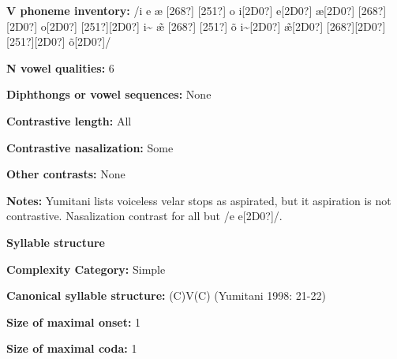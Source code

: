\begin{styleBody}
\textbf{V phoneme inventory:} /i e æ [268?] [251?] o i[2D0?] e[2D0?] æ[2D0?] [268?][2D0?] o[2D0?] [251?][2D0?] i\~{ } \~{æ} [268?] [251?] \~{o} i\~{ }[2D0?] \~{æ}[2D0?] [268?][2D0?] [251?][2D0?] \~{o}[2D0?]/
\end{styleBody}

\begin{styleBody}
\textbf{N vowel qualities:} 6
\end{styleBody}

\begin{styleBody}
\textbf{Diphthongs or vowel sequences:} None
\end{styleBody}

\begin{styleBody}
\textbf{Contrastive length:} All
\end{styleBody}

\begin{styleBody}
\textbf{Contrastive nasalization:} Some
\end{styleBody}

\begin{styleBody}
\textbf{Other contrasts:} None
\end{styleBody}

\begin{styleBody}
\textbf{Notes:} Yumitani lists voiceless velar stops as aspirated, but it aspiration is not contrastive. Nasalization contrast for all but /e e[2D0?]/.
\end{styleBody}

\begin{styleBody}
\textbf{Syllable structure}
\end{styleBody}

\begin{styleBody}
\textbf{Complexity Category:} Simple
\end{styleBody}

\begin{styleBody}
\textbf{Canonical syllable structure:} (C)V(C)\textbf{ }(Yumitani 1998: 21-22)
\end{styleBody}

\begin{styleBody}
\textbf{Size of maximal onset:} 1
\end{styleBody}

\begin{styleBody}
\textbf{Size of maximal coda:} 1
\end{styleBody}

